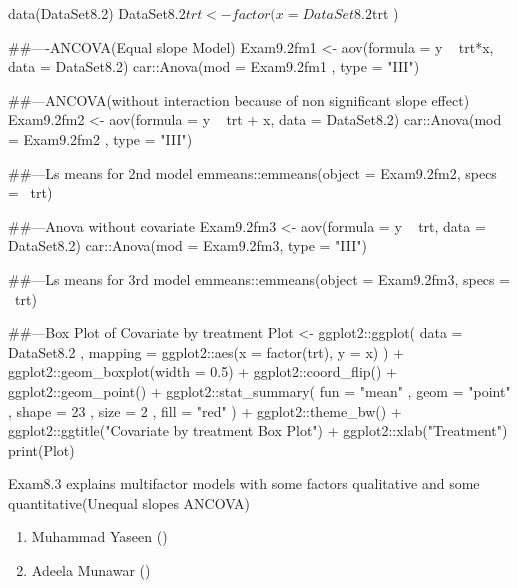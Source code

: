 \documentclass[a4paper]{book}
\begin{document}
\begin{Examples}
\begin{ExampleCode}

data(DataSet8.2)
DataSet8.2$trt <- factor( x = DataSet8.2$trt )

##----ANCOVA(Equal slope Model)
Exam9.2fm1 <- aov(formula = y ~ trt*x, data = DataSet8.2)
car::Anova(mod = Exam9.2fm1 , type = "III")

##---ANCOVA(without interaction because of non significant slope effect)
Exam9.2fm2 <- aov(formula = y ~ trt + x, data    = DataSet8.2)
car::Anova(mod = Exam9.2fm2 , type = "III")

##---Ls means for 2nd model
emmeans::emmeans(object  = Exam9.2fm2, specs = ~trt)

##---Anova without covariate
Exam9.2fm3 <- aov(formula = y ~ trt, data = DataSet8.2)
car::Anova(mod = Exam9.2fm3, type = "III")

##---Ls means for 3rd model
emmeans::emmeans(object = Exam9.2fm3, specs = ~trt)

##---Box Plot of Covariate by treatment
Plot <-
   ggplot2::ggplot(
          data    = DataSet8.2
        , mapping = ggplot2::aes(x = factor(trt), y = x)
         )                              +
   ggplot2::geom_boxplot(width = 0.5)  +
   ggplot2::coord_flip()               +
   ggplot2::geom_point()               +
   ggplot2::stat_summary(
         fun    = "mean"
       , geom   = "point"
       , shape  =  23
       , size   =  2
       , fill   = "red"
       )                               +
   ggplot2::theme_bw()                 +
   ggplot2::ggtitle("Covariate by treatment Box Plot") +
   ggplot2::xlab("Treatment")
print(Plot)

\end{ExampleCode}
\end{Examples}
%
\begin{Description}
Exam8.3 explains multifactor models with some factors qualitative and some quantitative(Unequal slopes ANCOVA)
\end{Description}
%
\begin{Author}
\begin{enumerate}

\item{}  Muhammad Yaseen ()
\item{} Adeela Munawar ()

\end{enumerate}

\end{Author}
\end{document}
